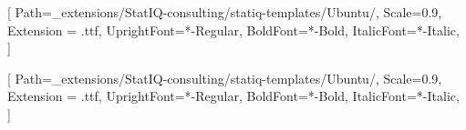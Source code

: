 \makeatletter
\renewcommand{\maketitle}{
  \begin{titlepage}
    \vspace*{2cm}
    \begin{flushleft}
      {\sffamily\Huge\textbf{\MakeUppercase{\@title}}} \\
      \vspace{0.5cm}
      {\sffamily\Large \@subtitle} \\
      \vspace{1cm}
      {\sffamily\large \@author}
    \end{flushleft}
    \vfill
    \begin{flushleft}
      {\sffamily\large \@date}
    \end{flushleft}
  \end{titlepage}
}
\makeatother



\setsansfont{Ubuntu}[
    Path=_extensions/StatIQ-consulting/statiq-templates/Ubuntu/,
    Scale=0.9,
    Extension = .ttf,
    UprightFont=*-Regular,
    BoldFont=*-Bold,
    ItalicFont=*-Italic,
    ]

\setmainfont{Ubuntu}[
    Path=_extensions/StatIQ-consulting/statiq-templates/Ubuntu/,
    Scale=0.9,
    Extension = .ttf,
    UprightFont=*-Regular,
    BoldFont=*-Bold,
    ItalicFont=*-Italic,
    ]